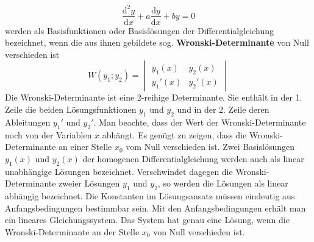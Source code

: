 \begin{equation}
\boxed{\dfrac{\text{d}^2y}{\text{d}x}+a\dfrac{\text{d}y}{\text{d}x}+by=0}
\end{equation}
werden als Basisfunktionen oder Basislösungen der Differentialgleichung bezeichnet, wenn die aus ihnen gebildete sog. \textbf{Wronski-Determinante} von Null verschieden ist
\begin{equation}
\boxed{W\left(y_1; y_2\right)=\begin{vmatrix}y_1\left(x\right)&y_2\left(x\right)\\y_1'\left(x\right)&y_2'\left(x\right)\end{vmatrix}}
\end{equation}
Die Wronski-Determinante ist eine 2-reihige Determinante. Sie enthält in der 1. Zeile die beiden Lösungsfunktionen $y_1$ und $y_2$ und in der 2. Zeile deren Ableitungen $y_1'$ und $y_2'$. Man beachte, dass der Wert der Wronski-Determinante noch von der Variablen $x$ abhängt. Es genügt zu zeigen, dass die Wronski-Determinante an einer Stelle $x_0$ vom Null verschieden ist.
\newline\newline
Zwei Basislösungen $y_1\left(x\right)$ und $y_2\left(x\right)$ der homogenen Differentialgleichung werden auch als linear unabhängige Lösungen bezeichnet. Verschwindet dagegen die Wronski-Determinante zweier Lösungen $y_1$ und $y_2$, so werden die Lösungen als linear abhängig bezeichnet. 
\newline\newline
Die Konstanten im Lösungsansatz müssen eindeutig aus Anfangsbedingungen bestimmbar sein. Mit den Anfangsbedingungen erhält man ein lineares Gleichungssystem. Das System hat genau eine Lösung, wenn die Wronski-Determinante an der Stelle $x_0$ von Null verschieden ist.
